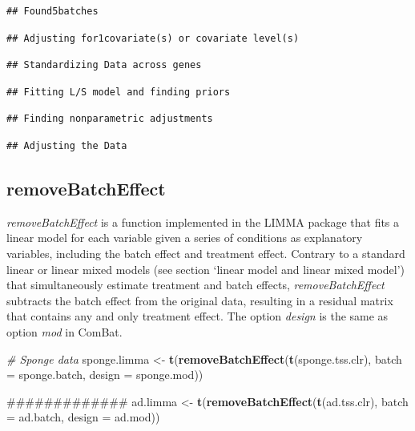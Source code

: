\documentclass[]{book}
\newenvironment{Shaded}{\begin{snugshade}}{\end{snugshade}}
\newcommand{\KeywordTok}[1]{\textcolor[rgb]{0.13,0.29,0.53}{\textbf{#1}}}
\newcommand{\DataTypeTok}[1]{\textcolor[rgb]{0.13,0.29,0.53}{#1}}
\newcommand{\StringTok}[1]{\textcolor[rgb]{0.31,0.60,0.02}{#1}}
\newcommand{\CommentTok}[1]{\textcolor[rgb]{0.56,0.35,0.01}{\textit{#1}}}
\newcommand{\NormalTok}[1]{#1}
\begin{document}
\begin{verbatim}
## Found5batches
\end{verbatim}

\begin{verbatim}
## Adjusting for1covariate(s) or covariate level(s)
\end{verbatim}

\begin{verbatim}
## Standardizing Data across genes
\end{verbatim}

\begin{verbatim}
## Fitting L/S model and finding priors
\end{verbatim}

\begin{verbatim}
## Finding nonparametric adjustments
\end{verbatim}

\begin{verbatim}
## Adjusting the Data
\end{verbatim}

\subsection{removeBatchEffect}\label{removebatcheffect}

\emph{removeBatchEffect} is a function implemented in the LIMMA package
that fits a linear model for each variable given a series of conditions
as explanatory variables, including the batch effect and treatment
effect. Contrary to a standard linear or linear mixed models (see
section `linear model and linear mixed model') that simultaneously
estimate treatment and batch effects, \emph{removeBatchEffect} subtracts
the batch effect from the original data, resulting in a residual matrix
that contains any and only treatment effect. The option \emph{design} is
the same as option \emph{mod} in ComBat.

\begin{Shaded}
\begin{Highlighting}[]
\CommentTok{# Sponge data}
\NormalTok{sponge.limma <-}\StringTok{ }\KeywordTok{t}\NormalTok{(}\KeywordTok{removeBatchEffect}\NormalTok{(}\KeywordTok{t}\NormalTok{(sponge.tss.clr), }\DataTypeTok{batch =}\NormalTok{ sponge.batch, }
                                    \DataTypeTok{design =}\NormalTok{ sponge.mod))}

\NormalTok{#############}
\NormalTok{ad.limma <-}\StringTok{ }\KeywordTok{t}\NormalTok{(}\KeywordTok{removeBatchEffect}\NormalTok{(}\KeywordTok{t}\NormalTok{(ad.tss.clr), }\DataTypeTok{batch =}\NormalTok{ ad.batch, }
                                \DataTypeTok{design =}\NormalTok{ ad.mod))}
\end{Highlighting}
\end{Shaded}
\end{document}
